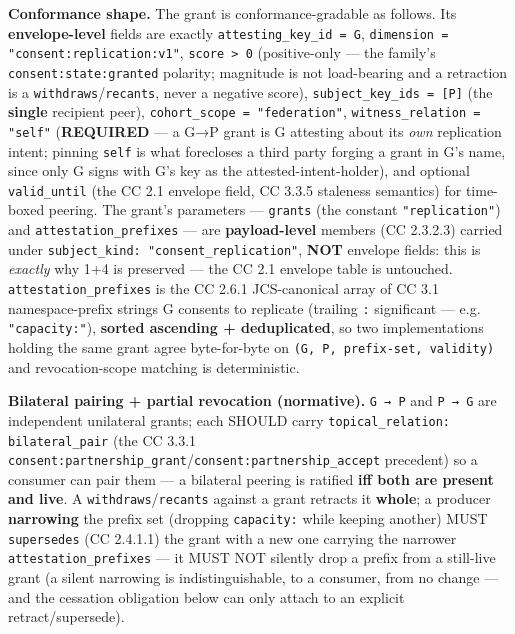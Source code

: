 \documentclass[11pt]{article}
\begin{document}
\textbf{Conformance shape.} The grant is conformance-gradable as follows. Its \textbf{envelope-level} fields are exactly \texttt{attesting\_key\_id = G}, \texttt{dimension = "consent:replication:v1"}, \texttt{score > 0} (positive-only — the family's \texttt{consent:state:granted} polarity; magnitude is not load-bearing and a retraction is a \texttt{withdraws}/\texttt{recants}, never a negative score), \texttt{subject\_key\_ids = [P]} (the \textbf{single} recipient peer), \texttt{cohort\_scope = "federation"}, \texttt{witness\_relation = "self"} (\textbf{REQUIRED} — a G→P grant is G attesting about its \textit{own} replication intent; pinning \texttt{self} is what forecloses a third party forging a grant in G's name, since only G signs with G's key as the attested-intent-holder), and optional \texttt{valid\_until} (the CC 2.1 envelope field, CC 3.3.5 staleness semantics) for time-boxed peering. The grant's parameters — \texttt{grants} (the constant \texttt{"replication"}) and \texttt{attestation\_prefixes} — are \textbf{payload-level} members (CC 2.3.2.3) carried under \texttt{subject\_kind: "consent\_replication"}, \textbf{NOT} envelope fields: this is \textit{exactly} why 1+4 is preserved — the CC 2.1 envelope table is untouched. \texttt{attestation\_prefixes} is the CC 2.6.1 JCS-canonical array of CC 3.1 namespace-prefix strings G consents to replicate (trailing \texttt{:} significant — e.g. \texttt{"capacity:"}), \textbf{sorted ascending + deduplicated}, so two implementations holding the same grant agree byte-for-byte on \texttt{(G, P, prefix-set, validity)} and revocation-scope matching is deterministic.


\textbf{Bilateral pairing + partial revocation (normative).} \texttt{G → P} and \texttt{P → G} are independent unilateral grants; each SHOULD carry \texttt{topical\_relation: bilateral\_pair} (the CC 3.3.1 \texttt{consent:partnership\_grant}/\texttt{consent:partnership\_accept} precedent) so a consumer can pair them — a bilateral peering is ratified \textbf{iff both are present and live}. A \texttt{withdraws}/\texttt{recants} against a grant retracts it \textbf{whole}; a producer \textbf{narrowing} the prefix set (dropping \texttt{capacity:} while keeping another) MUST \texttt{supersedes} (CC 2.4.1.1) the grant with a new one carrying the narrower \texttt{attestation\_prefixes} — it MUST NOT silently drop a prefix from a still-live grant (a silent narrowing is indistinguishable, to a consumer, from no change — and the cessation obligation below can only attach to an explicit retract/supersede).
\end{document}
